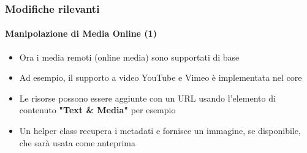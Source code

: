 \begin{frame}[fragile]
	\frametitle{Modifiche rilevanti}
	\framesubtitle{Manipolazione di Media Online (1)}

	\begin{itemize}

		\item Ora i media remoti (online media) sono supportati di base 

		\item Ad esempio, il supporto a video YouTube e Vimeo è implementata nel core

		\item Le risorse possono essere aggiunte con un URL usando l'elemento di contenuto \textbf{"Text \& Media"}
			per esempio

		\item Un helper class recupera i metadati e fornisce un immagine, se disponibile, che sarà usata come anteprima

	\end{itemize}

\end{frame}



